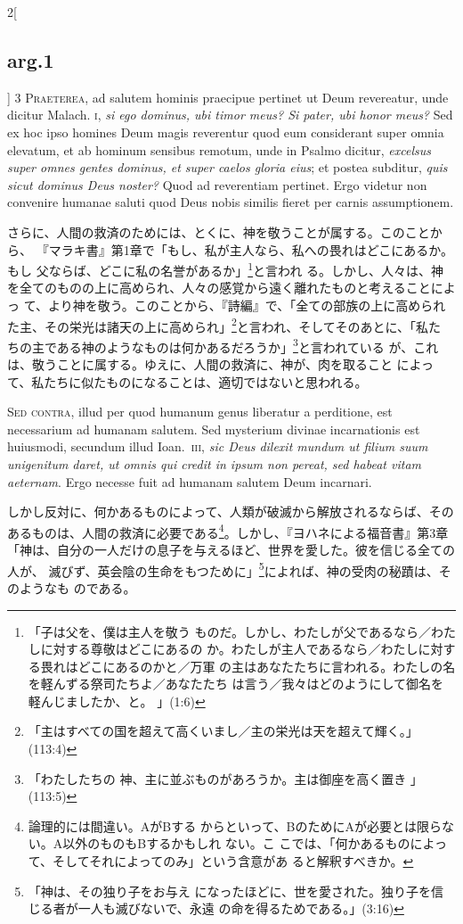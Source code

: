 \documentclass[paper=a4paper,fontsize=10pt,jafontsize=9pt,titlepage]{jlreq}
\begin{document}
\begin{paracol}{2}[\subsection{arg.1}]
{\scshape 3 Praeterea}, ad salutem hominis praecipue pertinet ut Deum
 revereatur, unde dicitur Malach. {\scshape i}, {\itshape si ego dominus, ubi timor meus? Si
 pater, ubi honor meus?} Sed ex hoc ipso homines Deum magis reverentur
 quod eum considerant super omnia elevatum, et ab hominum sensibus
 remotum, unde in Psalmo dicitur, {\itshape excelsus super omnes gentes dominus,
 et super caelos gloria eius}; et postea subditur,  {\itshape quis sicut dominus
 Deus noster?} Quod ad reverentiam pertinet. Ergo videtur non convenire
 humanae saluti quod Deus nobis similis fieret per carnis assumptionem.

\switchcolumn

さらに、人間の救済のためには、とくに、神を敬うことが属する。このことから、
 『マラキ書』第1章で「もし、私が主人なら、私への畏れはどこにあるか。もし
 父ならば、どこに私の名誉があるか」\footnote{「子は父を、僕は主人を敬う
 ものだ。しかし、わたしが父であるなら／わたしに対する尊敬はどこにあるの
 か。わたしが主人であるなら／わたしに対する畏れはどこにあるのかと／万軍
 の主はあなたたちに言われる。わたしの名を軽んずる祭司たちよ／あなたたち
 は言う／我々はどのようにして御名を軽んじましたか、と。 」(1:6)}と言われ
 る。しかし、人々は、神を全てのものの上に高められ、人々の感覚から遠く離れたものと考えることによっ
 て、より神を敬う。このことから、『詩編』で、「全ての部族の上に高められ
 た主、その栄光は諸天の上に高められ」\footnote{「主はすべての国を超えて高くいまし／主の栄光は天を超えて輝く。」(113:4)}と言われ、そしてそのあとに、「私た
 ちの主である神のようなものは何かあるだろうか」\footnote{「わたしたちの
 神、主に並ぶものがあろうか。主は御座を高く置き 」(113:5)}と言われている
 が、これは、敬うことに属する。ゆえに、人間の救済に、神が、肉を取ること
 によって、私たちに似たものになることは、適切ではないと思われる。

\switchcolumn*[\subsection{s.c.}]

{\scshape Sed contra}, illud per quod humanum genus liberatur a
 perditione, est necessarium ad humanam salutem. Sed mysterium divinae
 incarnationis est huiusmodi, secundum illud Ioan.~{\scshape iii}, {\itshape sic Deus dilexit
 mundum ut filium suum unigenitum daret, ut omnis qui credit in ipsum
 non pereat, sed habeat vitam aeternam}. Ergo necesse fuit ad humanam
 salutem Deum incarnari.

\switchcolumn

しかし反対に、何かあるものによって、人類が破滅から解放されるならば、その
 あるものは、人間の救済に必要である\footnote{論理的には間違い。AがBする
 からといって、BのためにAが必要とは限らない。A以外のものもBするかもしれ
 ない。こ
 こでは、「何かあるものによって、そしてそれによってのみ」という含意があ
 ると解釈すべきか。}。しかし、『ヨハネによる福音書』第3章
 「神は、自分の一人だけの息子を与えるほど、世界を愛した。彼を信じる全ての人が、
 滅びず、英会陰の生命をもつために」\footnote{「神は、その独り子をお与え
 になったほどに、世を愛された。独り子を信じる者が一人も滅びないで、永遠
 の命を得るためである。」(3:16)}によれば、神の受肉の秘蹟は、そのようなも
 のである。


\end{paracol}
\end{document}

